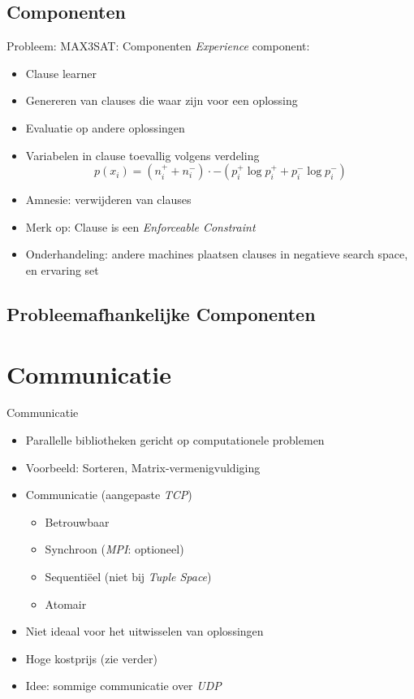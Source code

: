 \documentclass[handout]{beamer}
\begin{document}
\subsection{Componenten}
\begin{frame}{Probleem: MAX3SAT: Componenten}
\emph{Experience} component:
\begin{itemize}[<+->]
 \item Clause learner
 \item Genereren van clauses die waar zijn voor een oplossing
 \item Evaluatie op andere oplossingen
 \item Variabelen in clause toevallig volgens verdeling
 \begin{equation}
  p(x_i)=(n_i^++n_i^-)\cdot -(p_i^+\log p_i^++p_i^-\log p_i^-)
 \end{equation}
 \item Amnesie: verwijderen van clauses
 \item Merk op: Clause is een \emph{Enforceable Constraint}
 \item Onderhandeling: andere machines plaatsen clauses in negatieve search space, en ervaring set
\end{itemize}
\end{frame}
\subsection{Probleemafhankelijke Componenten}
\section{Communicatie}
\begin{frame}{Communicatie}
\begin{itemize}[<+->]
 \item Parallelle bibliotheken gericht op computationele problemen
 \item Voorbeeld: Sorteren, Matrix-vermenigvuldiging
 \item Communicatie (aangepaste \emph{TCP})
 \begin{itemize}[<+->]
  \item Betrouwbaar
  \item Synchroon (\emph{MPI}: optioneel)
  \item Sequenti\"eel (niet bij \emph{Tuple Space})
  \item Atomair
 \end{itemize}
 \item Niet ideaal voor het uitwisselen van oplossingen
 \item Hoge kostprijs (zie verder)
 \item Idee: sommige communicatie over \emph{UDP}
\end{itemize}
\end{frame}
\end{document}

